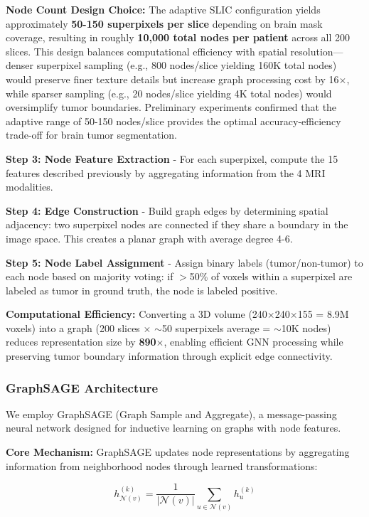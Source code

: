 \textbf{Node Count Design Choice:} The adaptive SLIC configuration yields approximately \textbf{50-150 superpixels per slice} depending on brain mask coverage, resulting in roughly \textbf{10,000 total nodes per patient} across all 200 slices. This design balances computational efficiency with spatial resolution—denser superpixel sampling (e.g., 800 nodes/slice yielding 160K total nodes) would preserve finer texture details but increase graph processing cost by 16$\times$, while sparser sampling (e.g., 20 nodes/slice yielding 4K total nodes) would oversimplify tumor boundaries. Preliminary experiments confirmed that the adaptive range of 50-150 nodes/slice provides the optimal accuracy-efficiency trade-off for brain tumor segmentation.

\textbf{Step 3: Node Feature Extraction} - For each superpixel, compute the 15 features described previously by aggregating information from the 4 MRI modalities.

\textbf{Step 4: Edge Construction} - Build graph edges by determining spatial adjacency: two superpixel nodes are connected if they share a boundary in the image space. This creates a planar graph with average degree 4-6.

\textbf{Step 5: Node Label Assignment} - Assign binary labels (tumor/non-tumor) to each node based on majority voting: if $>$50\% of voxels within a superpixel are labeled as tumor in ground truth, the node is labeled positive.

\textbf{Computational Efficiency:} Converting a 3D volume (240$\times$240$\times$155 = 8.9M voxels) into a graph (200 slices $\times$ $\sim$50 superpixels average = $\sim$10K nodes) reduces representation size by \textbf{890$\times$}, enabling efficient GNN processing while preserving tumor boundary information through explicit edge connectivity.

\subsubsection{GraphSAGE Architecture}

We employ GraphSAGE (Graph Sample and Aggregate), a message-passing neural network designed for inductive learning on graphs with node features.

\textbf{Core Mechanism:} GraphSAGE updates node representations by aggregating information from neighborhood nodes through learned transformations:

\begin{equation}
h_{\mathcal{N}(v)}^{(k)} = \frac{1}{|\mathcal{N}(v)|} \sum_{u \in \mathcal{N}(v)} h_u^{(k)}
\end{equation}

